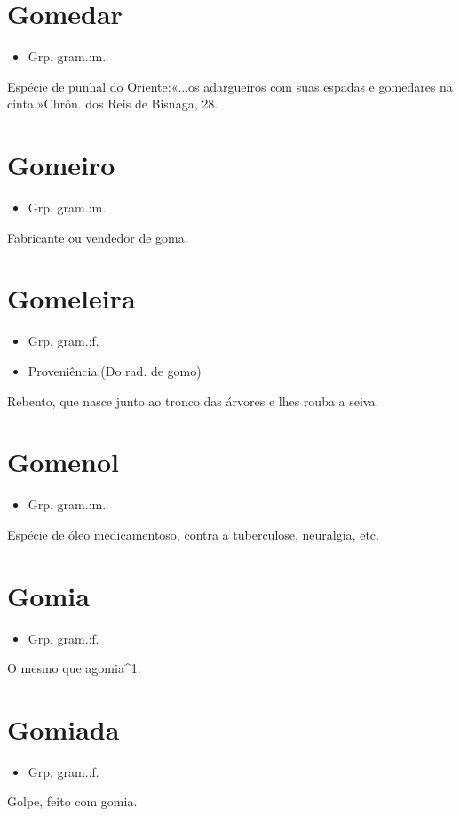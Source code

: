 \section{Gomedar}
\begin{itemize}
\item {Grp. gram.:m.}
\end{itemize}
Espécie de punhal do Oriente:«\textunderscore ...os adargueiros com suas espadas e gomedares na cinta.\textunderscore »\textunderscore Chrôn. dos Reis de Bisnaga\textunderscore , 28.
\section{Gomeiro}
\begin{itemize}
\item {Grp. gram.:m.}
\end{itemize}
Fabricante ou vendedor de goma.
\section{Gomeleira}
\begin{itemize}
\item {Grp. gram.:f.}
\end{itemize}
\begin{itemize}
\item {Proveniência:(Do rad. de \textunderscore gomo\textunderscore )}
\end{itemize}
Rebento, que nasce junto ao tronco das árvores e lhes rouba a seiva.
\section{Gomenol}
\begin{itemize}
\item {Grp. gram.:m.}
\end{itemize}
Espécie de óleo medicamentoso, contra a tuberculose, neuralgia, etc.
\section{Gomia}
\begin{itemize}
\item {Grp. gram.:f.}
\end{itemize}
O mesmo que \textunderscore agomia\textunderscore ^1.
\section{Gomiada}
\begin{itemize}
\item {Grp. gram.:f.}
\end{itemize}
Golpe, feito com gomia.
